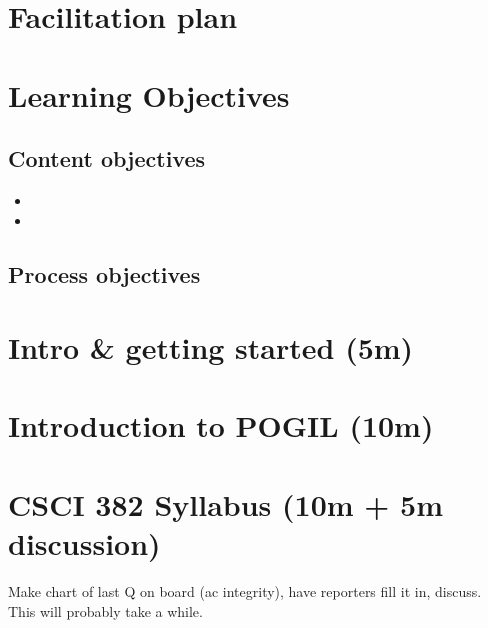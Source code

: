\documentclass{tufte-handout}
\begin{document}
\newpage

\section{Facilitation plan}
\label{sec:facilitation}

\section{Learning Objectives}

\subsection{Content objectives}

\begin{itemize}
\item \lobjectiveA
\item \lobjectiveB
\end{itemize}

\subsection{Process objectives}

\section{Intro \& getting started (5m)}

\section{Introduction to POGIL (10m)}

\section{CSCI 382 Syllabus (10m + 5m discussion)}

Make chart of last Q on board (ac integrity), have reporters fill it
in, discuss.  This will probably take a while.
\end{document}
